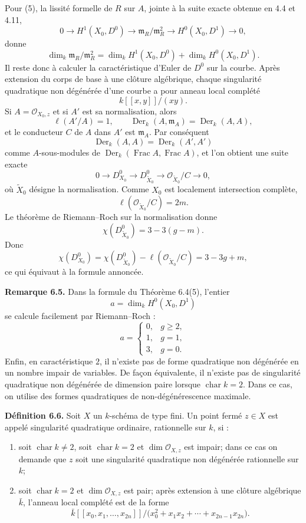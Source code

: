 \documentclass[11pt]{article}
\providecommand{\Der}{\operatorname{Der}}
\providecommand{\Frac}{\operatorname{Frac}}
\providecommand{\Oo}{\mathcal O}
\begin{document}
Pour (5), la lissité formelle de \(R\) sur \(A\), jointe à la suite exacte obtenue en 4.4 et 4.11,
\[
        0\to H^1(X_0,D^0)\to \mathfrak m_R/\mathfrak m_R^2
        \to H^0(X_0,D^1)\to 0,
\]
donne
\[
        \dim_k\mathfrak m_R/\mathfrak m_R^2
        =
        \dim_k H^1(X_0,D^0)+\dim_kH^0(X_0,D^1).
\]
Il reste donc à calculer la caractéristique d'Euler de \(D^0\) sur la courbe.  Après extension du corps de base à une clôture algébrique, chaque singularité quadratique non dégénérée d'une courbe a pour anneau local complété
\[
        k[[x,y]]/(xy).
\]
Si \(A=\Oo_{X_0,z}\) et si \(A'\) est sa normalisation, alors
\[
        \ell(A'/A)=1,\qquad
        \Der_k(A,\mathfrak m_A)=\Der_k(A,A),
\]
et le conducteur \(C\) de \(A\) dans \(A'\) est \(\mathfrak m_A\).  Par conséquent
\[
        \Der_k(A,A)=\Der_k(A',A')
\]
comme \(A\)-sous-modules de \(\Der_k(\Frac A,\Frac A)\), et l'on obtient une suite exacte
\[
        0\to D^0_{X_0}
        \to D^0_{\widetilde X_0}
        \to \Oo_{\widetilde X_0}/C
        \to 0,
\]
où \(\widetilde X_0\) désigne la normalisation.  Comme \(X_0\) est localement intersection complète,
\[
        \ell(\Oo_{\widetilde X_0}/C)=2m.
\]
Le théorème de Riemann--Roch sur la normalisation donne
\[
        \chi(D^0_{\widetilde X_0})=3-3(g-m).
\]
Donc
\[
        \chi(D^0_{X_0})
        =
        \chi(D^0_{\widetilde X_0})-\ell(\Oo_{\widetilde X_0}/C)
        =
        3-3g+m,
\]
ce qui équivaut à la formule annoncée.

\textbf{Remarque 6.5.}  Dans la formule du Théorème 6.4(5), l'entier
\[
        a=\dim_k H^0(X_0,D^1)
\]
se calcule facilement par Riemann--Roch :
\[
        a=
        \begin{cases}
        0,& g\geq 2,\\
        1,& g=1,\\
        3,& g=0.
        \end{cases}
\]
Enfin, en caractéristique \(2\), il n'existe pas de forme quadratique non dégénérée en un nombre impair de variables.  De façon équivalente, il n'existe pas de singularité quadratique non dégénérée de dimension paire lorsque \(\operatorname{char}k=2\).  Dans ce cas, on utilise des formes quadratiques de non-dégénérescence maximale.

\textbf{Définition 6.6.}  Soit \(X\) un \(k\)-schéma de type fini.  Un point fermé \(z\in X\) est appelé singularité quadratique ordinaire, rationnelle sur \(k\), si :
\begin{enumerate}[label=(\roman*)]
\item soit \(\operatorname{char}k\neq 2\), soit \(\operatorname{char}k=2\) et \(\dim\Oo_{X,z}\) est impair; dans ce cas on demande que \(z\) soit une singularité quadratique non dégénérée rationnelle sur \(k\);
\item soit \(\operatorname{char}k=2\) et \(\dim\Oo_{X,z}\) est pair; après extension à une clôture algébrique \(\bar k\), l'anneau local complété est de la forme
\[
        \bar k[[x_0,x_1,\ldots,x_{2n}]]
        /\bigl(x_0^2+x_1x_2+\cdots+x_{2n-1}x_{2n}\bigr).
\]
\end{enumerate}
\end{document}
